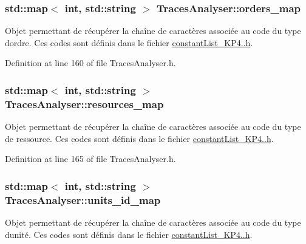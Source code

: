 \subsubsection[{\texorpdfstring{orders\+\_\+map}{orders_map}}]{\setlength{\rightskip}{0pt plus 5cm}std\+::map$<$ int, std\+::string $>$ Traces\+Analyser\+::orders\+\_\+map\hspace{0.3cm}{\ttfamily [static]}}\hypertarget{class_traces_analyser_ac37a3052687b9fc98c38e8ca870157be}{}\label{class_traces_analyser_ac37a3052687b9fc98c38e8ca870157be}
Objet permettant de récupérer la chaîne de caractères associée au code du type d\textquotesingle{}ordre. Ces codes sont définis dans le fichier \hyperlink{constant_list___k_p4_84_8h}{constant\+List\+\_\+\+K\+P4..\+h}. 

Definition at line 160 of file Traces\+Analyser.\+h.

\subsubsection[{\texorpdfstring{resources\+\_\+map}{resources_map}}]{\setlength{\rightskip}{0pt plus 5cm}std\+::map$<$ int, std\+::string $>$ Traces\+Analyser\+::resources\+\_\+map\hspace{0.3cm}{\ttfamily [static]}}\hypertarget{class_traces_analyser_af64ea0a819c3a124563fe7d0ff6e455f}{}\label{class_traces_analyser_af64ea0a819c3a124563fe7d0ff6e455f}
Objet permettant de récupérer la chaîne de caractères associée au code du type de ressource. Ces codes sont définis dans le fichier \hyperlink{constant_list___k_p4_84_8h}{constant\+List\+\_\+\+K\+P4..\+h}. 

Definition at line 165 of file Traces\+Analyser.\+h.

\subsubsection[{\texorpdfstring{units\+\_\+id\+\_\+map}{units_id_map}}]{\setlength{\rightskip}{0pt plus 5cm}std\+::map$<$ int, std\+::string $>$ Traces\+Analyser\+::units\+\_\+id\+\_\+map\hspace{0.3cm}{\ttfamily [static]}}\hypertarget{class_traces_analyser_a5e748c4f52e6cbad197b08c7e0273cd8}{}\label{class_traces_analyser_a5e748c4f52e6cbad197b08c7e0273cd8}
Objet permettant de récupérer la chaîne de caractères associée au code du type d\textquotesingle{}unité. Ces codes sont définis dans le fichier \hyperlink{constant_list___k_p4_84_8h}{constant\+List\+\_\+\+K\+P4..\+h}. 

